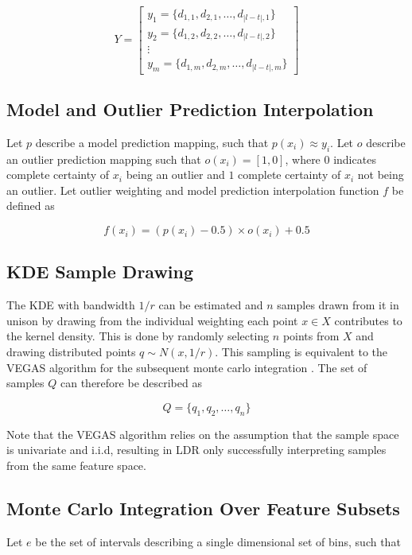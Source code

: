 \documentclass[a4paper, twocolumn]{article}
\begin{document}
$$Y =
\begin{bmatrix}
{y_1 = \{d_{1, 1}, d_{2, 1}, \ldots, d_{|l-t|, 1}\}} \\
{y_2 = \{d_{1, 2}, d_{2, 2}, \ldots, d_{|l-t|, 2}\}} \\
\vdots \\
{y_m = \{d_{1, m}, d_{2, m}, \ldots, d_{|l-t|, m}\}}
\end{bmatrix}
$$

\subsection{Model and Outlier Prediction Interpolation}

Let $p$ describe a model prediction mapping, such that $p(x_i) \approx y_i$. Let $o$ describe an outlier prediction mapping such that $o(x_i) = [1, 0]$, where $0$ indicates complete certainty of $x_i$ being an outlier and $1$ complete certainty of $x_i$ not being an outlier. Let outlier weighting and model prediction interpolation function $f$ be defined as

$$f(x_i) = (p(x_i) - 0.5) \times o(x_i) + 0.5$$

\subsection{KDE Sample Drawing}

The KDE with bandwidth $1/r$ can be estimated and $n$ samples drawn from it in unison by drawing from the individual weighting each point $x \in X$ contributes to the kernel density. This is done by randomly selecting $n$ points from $X$ and drawing distributed points $q \sim N(x, 1/r)$. This sampling is equivalent to the VEGAS algorithm for the subsequent monte carlo integration \cite{lepage1978new}. The set of samples $Q$ can therefore be described as

$$Q = \{q_1, q_2, \ldots, q_n\}$$

Note that the VEGAS algorithm relies on the assumption that the sample space is univariate and i.i.d, resulting in LDR only successfully interpreting samples from the same feature space.

\subsection{Monte Carlo Integration Over Feature Subsets}

Let $e$ be the set of intervals describing a single dimensional set of bins, such that
\end{document}

